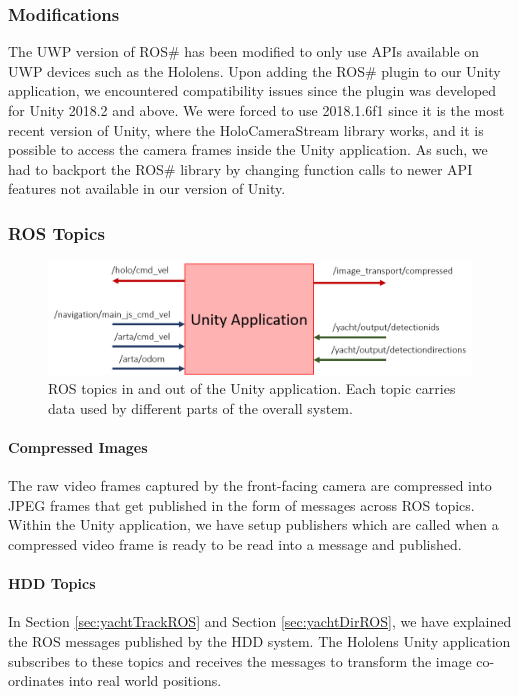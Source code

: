 \subsubsection{Modifications} The UWP version of ROS\# has been modified to only use APIs available on UWP devices such as the Hololens. Upon adding the ROS\# plugin to our Unity application, we encountered compatibility issues since the plugin was developed for Unity 2018.2 and above. We were forced to use 2018.1.6f1 since it is the most recent version of Unity, where the HoloCameraStream library works, and it is possible to access the camera frames inside the Unity application. As such, we had to backport the ROS\# library by changing function calls to newer API features not available in our version of Unity.

\subsubsection{ROS Topics}

\begin{figure}[ht]
    \centering
    \includegraphics[width=1.0\linewidth]{img/chapter5_implementation/holoROSTopics.png}
    \caption{ROS topics in and out of the Unity application. Each topic carries data used by different parts of the overall system.}
    \label{fig:unityComms}
\end{figure}

\paragraph{Compressed Images} The raw video frames captured by the front-facing camera are compressed into JPEG frames that get published in the form of  messages across ROS topics. Within the Unity application, we have setup  publishers which are called when a compressed video frame is ready to be read into a message and published.

\paragraph{HDD Topics} In Section \ref{sec:yachtTrackROS} and Section \ref{sec:yachtDirROS}, we have explained the ROS messages published by the HDD system. The Hololens Unity application subscribes to these topics and receives the messages to transform the image co-ordinates into real world positions.

